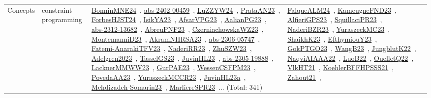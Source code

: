{\begin{longtable}{lp{3cm}>{\raggedright\arraybackslash}p{6cm}>{\raggedright\arraybackslash}p{6cm}>{\raggedright\arraybackslash}p{8cm}}
\index{constraint programming}\index{Concepts!constraint programming}Concepts & constraint programming & \href{../works/BonninMNE24.pdf}{BonninMNE24}~\cite{BonninMNE24}, \href{../works/abs-2402-00459.pdf}{abs-2402-00459}~\cite{abs-2402-00459}, \href{../works/LuZZYW24.pdf}{LuZZYW24}~\cite{LuZZYW24}, \href{../works/PrataAN23.pdf}{PrataAN23}~\cite{PrataAN23}, \href{../works/ForbesHJST24.pdf}{ForbesHJST24}~\cite{ForbesHJST24}, \href{../works/IsikYA23.pdf}{IsikYA23}~\cite{IsikYA23}, \href{../works/AfsarVPG23.pdf}{AfsarVPG23}~\cite{AfsarVPG23}, \href{../works/AalianPG23.pdf}{AalianPG23}~\cite{AalianPG23}, \href{../works/abs-2312-13682.pdf}{abs-2312-13682}~\cite{abs-2312-13682}, \href{../works/AbreuPNF23.pdf}{AbreuPNF23}~\cite{AbreuPNF23}, \href{../works/CzerniachowskaWZ23.pdf}{CzerniachowskaWZ23}~\cite{CzerniachowskaWZ23}, \href{../works/MontemanniD23.pdf}{MontemanniD23}~\cite{MontemanniD23}, \href{../works/AkramNHRSA23.pdf}{AkramNHRSA23}~\cite{AkramNHRSA23}, \href{../works/abs-2306-05747.pdf}{abs-2306-05747}~\cite{abs-2306-05747}, \href{../works/Fatemi-AnarakiTFV23.pdf}{Fatemi-AnarakiTFV23}~\cite{Fatemi-AnarakiTFV23}, \href{../works/NaderiRR23.pdf}{NaderiRR23}~\cite{NaderiRR23}, \href{../works/ZhuSZW23.pdf}{ZhuSZW23}~\cite{ZhuSZW23}, \href{../works/Adelgren2023.pdf}{Adelgren2023}~\cite{Adelgren2023}, \href{../works/TasselGS23.pdf}{TasselGS23}~\cite{TasselGS23}, \href{../works/JuvinHL23.pdf}{JuvinHL23}~\cite{JuvinHL23}, \href{../works/abs-2305-19888.pdf}{abs-2305-19888}~\cite{abs-2305-19888}, \href{../works/LacknerMMWW23.pdf}{LacknerMMWW23}~\cite{LacknerMMWW23}, \href{../works/GurPAE23.pdf}{GurPAE23}~\cite{GurPAE23}, \href{../works/WessenCSFPM23.pdf}{WessenCSFPM23}~\cite{WessenCSFPM23}, \href{../works/PovedaAA23.pdf}{PovedaAA23}~\cite{PovedaAA23}, \href{../works/YuraszeckMCCR23.pdf}{YuraszeckMCCR23}~\cite{YuraszeckMCCR23}, \href{../works/JuvinHL23a.pdf}{JuvinHL23a}~\cite{JuvinHL23a}, \href{../works/Mehdizadeh-Somarin23.pdf}{Mehdizadeh-Somarin23}~\cite{Mehdizadeh-Somarin23}, \href{../works/MarliereSPR23.pdf}{MarliereSPR23}~\cite{MarliereSPR23}... (Total: 341) & \href{../works/FalqueALM24.pdf}{FalqueALM24}~\cite{FalqueALM24}, \href{../works/KameugneFND23.pdf}{KameugneFND23}~\cite{KameugneFND23}, \href{../works/AlfieriGPS23.pdf}{AlfieriGPS23}~\cite{AlfieriGPS23}, \href{../works/SquillaciPR23.pdf}{SquillaciPR23}~\cite{SquillaciPR23}, \href{../works/NaderiBZR23.pdf}{NaderiBZR23}~\cite{NaderiBZR23}, \href{../works/YuraszeckMC23.pdf}{YuraszeckMC23}~\cite{YuraszeckMC23}, \href{../works/ShaikhK23.pdf}{ShaikhK23}~\cite{ShaikhK23}, \href{../works/EfthymiouY23.pdf}{EfthymiouY23}~\cite{EfthymiouY23}, \href{../works/GokPTGO23.pdf}{GokPTGO23}~\cite{GokPTGO23}, \href{../works/WangB23.pdf}{WangB23}~\cite{WangB23}, \href{../works/JungblutK22.pdf}{JungblutK22}~\cite{JungblutK22}, \href{../works/NaqviAIAAA22.pdf}{NaqviAIAAA22}~\cite{NaqviAIAAA22}, \href{../works/LuoB22.pdf}{LuoB22}~\cite{LuoB22}, \href{../works/OuelletQ22.pdf}{OuelletQ22}~\cite{OuelletQ22}, \href{../works/VlkHT21.pdf}{VlkHT21}~\cite{VlkHT21}, \href{../works/KoehlerBFFHPSSS21.pdf}{KoehlerBFFHPSSS21}~\cite{KoehlerBFFHPSSS21}, \href{../works/Zahout21.pdf}{Zahout21}~\cite{Zahout21}, 
\end{longtable}}
